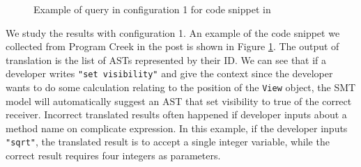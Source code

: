 \begin{figure}[]
        \caption{\label{fig:android_example} Example of query in configuration 1 for code snippet in \cite{id:ProgramCreekAndroidExample}}
      \end{figure}

We study the results with configuration 1. An example of the code snippet we collected from Program Creek in the post \cite{id:ProgramCreekAndroidExample} is shown in Figure \ref{fig:android_example}. The output of translation is the list of ASTs represented by their ID. We can see that if a developer writes \texttt{"set visibility"} and give the context since the developer wants to do some calculation relating to the position of the \texttt{View} object, the SMT model will automatically suggest an AST that set visibility to true of the correct receiver. Incorrect translated results often happened if developer inputs about a method name on complicate expression. In this example, if the developer inputs \texttt{"sqrt"}, the translated result is to accept a single integer variable, while the correct result requires four integers as parameters.   